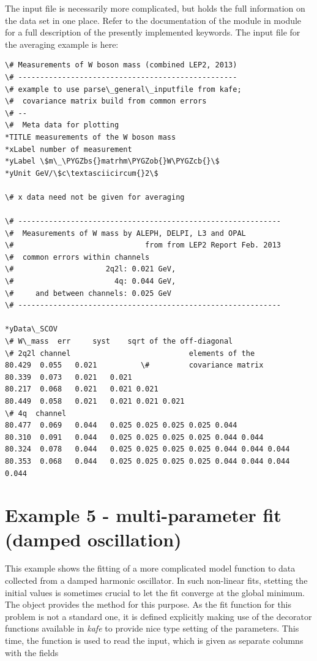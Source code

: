\documentclass[a4paper,10pt,english]{sphinxmanual}
\def\PYGZbs{\char`\\}
\def\PYGZob{\char`\{}
\def\PYGZcb{\char`\}}
\begin{document}
The input file is necessarily more complicated, but holds
the full information on the data set in one place. Refer to
the documentation of the module 
in module  for a full description of the
presently implemented keywords. The input file for the
averaging example is here:

\begin{Verbatim}[commandchars=\\\{\}]
\# Measurements of W boson mass (combined LEP2, 2013)
\# --------------------------------------------------
\# example to use parse\_general\_inputfile from kafe;
\#  covariance matrix build from common errors
\# --
\#  Meta data for plotting
*TITLE measurements of the W boson mass
*xLabel number of measurement
*yLabel \$m\_\PYGZbs{}matrhm\PYGZob{}W\PYGZcb{}\$
*yUnit GeV/\$c\textasciicircum{}2\$

\# x data need not be given for averaging

\# ------------------------------------------------------------
\#  Measurements of W mass by ALEPH, DELPI, L3 and OPAL
\#                              from from LEP2 Report Feb. 2013
\#  common errors within channels
\#                     2q2l: 0.021 GeV,
\#                       4q: 0.044 GeV,
\#     and between channels: 0.025 GeV
\# ------------------------------------------------------------

*yData\_SCOV
\# W\_mass  err     syst    sqrt of the off-diagonal
\# 2q2l channel                           elements of the
80.429  0.055   0.021          \#         covariance matrix
80.339  0.073   0.021   0.021
80.217  0.068   0.021   0.021 0.021
80.449  0.058   0.021   0.021 0.021 0.021
\# 4q  channel
80.477  0.069   0.044   0.025 0.025 0.025 0.025 0.044
80.310  0.091   0.044   0.025 0.025 0.025 0.025 0.044 0.044
80.324  0.078   0.044   0.025 0.025 0.025 0.025 0.044 0.044 0.044
80.353  0.068   0.044   0.025 0.025 0.025 0.025 0.044 0.044 0.044 0.044
\end{Verbatim}


\section{Example 5 - multi-parameter fit (damped oscillation)}
\label{index:example-5-multi-parameter-fit-damped-oscillation}
This example shows the fitting of a more complicated model function
to data collected from a damped harmonic oscillator. In such
non-linear fits, stetting the initial values is sometimes crucial
to let the fit converge at the global minimum. The  object
provides the method  for this purpose. As the
fit function for this problem is not a standard one, it is defined
explicitly making use of the decorator functions available in \emph{kafe}
to provide nice type setting of the parameters. This time, the
function  is used to read the input,
which is given as separate columns with the fields
\begin{quote}

\end{quote}
\end{document}
